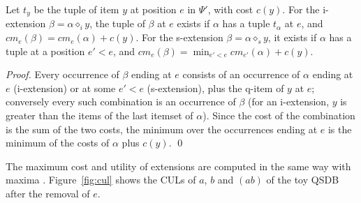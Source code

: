 \documentclass[runningheads]{llncs}
\begin{document}
\begin{lemma}\label{lem:cul}
Let $t_y$ be the tuple of item $y$ at position $e$ in $\Psi'$, with cost $c(y)$. For the
i-extension $\beta = \alpha \diamond_i y$, the tuple of $\beta$ at $e$ exists if $\alpha$ has a
tuple $t_\alpha$ at $e$, and $\mathit{cm}_e(\beta) = \mathit{cm}_e(\alpha) + c(y)$. For the
s-extension $\beta = \alpha \diamond_s y$, it exists if $\alpha$ has a tuple at a position
$e' < e$, and $\mathit{cm}_e(\beta) = \min_{e' < e} \mathit{cm}_{e'}(\alpha) + c(y)$.
\end{lemma}
\begin{proof}
Every occurrence of $\beta$ ending at $e$ consists of an occurrence of $\alpha$ ending at $e$
(i-extension) or at some $e' < e$ (s-extension), plus the q-item of $y$ at $e$; conversely
every such combination is an occurrence of $\beta$ (for an i-extension, $y$ is greater than the
items of the last itemset of $\alpha$). Since the cost of the combination is the sum of the two
costs, the minimum over the occurrences ending at $e$ is the minimum of the costs of $\alpha$
plus $c(y)$. \qed
\end{proof}

The maximum cost and utility of extensions are computed in the same way with maxima
\cite[Section~5.1.3]{truong2022}. Figure~\ref{fig:cul} shows the CULs of $a$, $b$ and $(ab)$ of
the toy QSDB after the removal of $e$.
\end{document}
